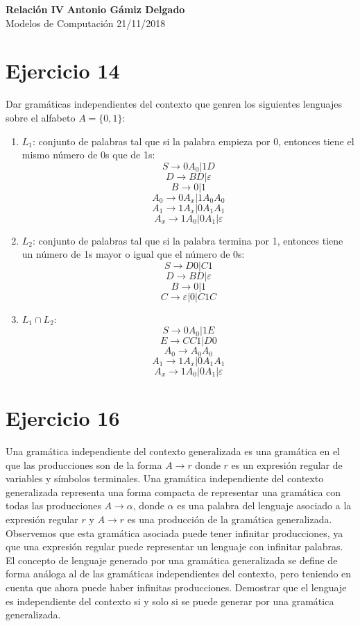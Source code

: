 \documentclass[a4paper, 11pt]{article}
\begin{document}
\noindent
\large\textbf{Relación IV} \hfill \textbf{Antonio Gámiz Delgado} \\
\normalsize Modelos de Computación \hfill 21/11/2018

\section*{Ejercicio 14}
Dar gramáticas independientes del contexto que genren los siguientes lenguajes sobre el alfabeto $A=\{0,1\}$:
\begin{enumerate}
\item $L_1$: conjunto de palabras tal que si la palabra empieza por 0, entonces tiene el mismo número de 0s que de 1s:
\[S\longrightarrow 0A_0|1D\]
\[ D \longrightarrow BD|\varepsilon\]
\[ B\longrightarrow 0|1\]
\[ A_0\longrightarrow 0A_x|1A_0A_0\]
\[ A_1\longrightarrow 1A_x|0A_1A_1\]
\[ A_x\longrightarrow 1A_0|0A_1|\varepsilon\]
\item $L_2$: conjunto de palabras tal que si la palabra termina por 1, entonces tiene un número de 1s mayor o igual que el número de 0s:
\[ S\longrightarrow D0|C1\]
\[ D\longrightarrow BD|\varepsilon\]
\[ B\longrightarrow 0|1\]
\[ C\longrightarrow \varepsilon|0|C1C\]
\item $L_1\cap L_2$:
\[ S\longrightarrow 0A_0|1E \]
\[ E\longrightarrow CC1|D0\]
\[ A_0\longrightarrow A_0A_0\]
\[ A_1\longrightarrow 1A_x|0A_1A_1\]
\[ A_x\longrightarrow 1A_0|0A_1|\varepsilon\]
\end{enumerate}
\section*{Ejercicio 16}
Una gramática independiente del contexto generalizada es una gramática en el que las producciones son de la forma $A\longrightarrow r$ donde $r$ es un expresión regular de variables y símbolos terminales. Una gramática independiente del contexto generalizada representa una forma compacta de representar una gramática con todas las producciones $A\longrightarrow\alpha$, donde $\alpha$ es una palabra del lenguaje asociado a la expresión regular $r$ y $A\longrightarrow r$ es una producción de la gramática generalizada. Observemos que esta gramática asociada puede tener infinitar producciones, ya que una expresión regular puede representar un lenguaje con infinitar palabras. El concepto de lenguaje generado por una gramática generalizada se define de forma análoga al de las gramáticas independientes del contexto, pero teniendo en cuenta que ahora puede haber infinitas producciones. Demostrar que el lenguaje es independiente del contexto si y solo si se puede generar por una gramática generalizada.
\end{document}
